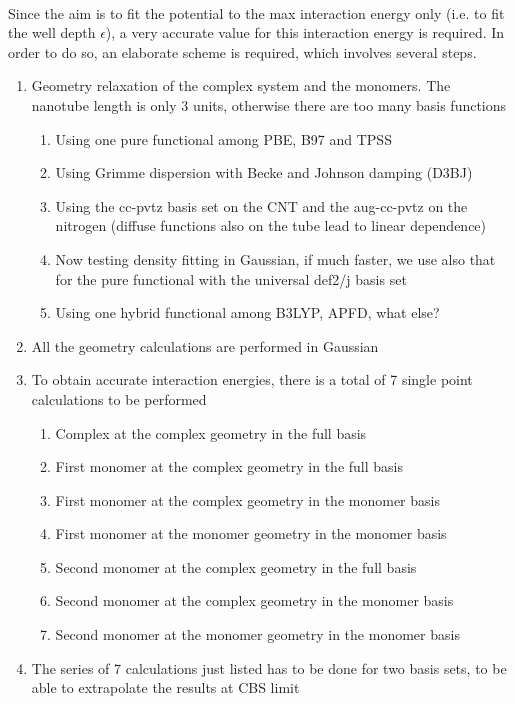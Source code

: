\documentclass[utf8]{article}
\begin{document}
\\
Since the aim is to fit the potential to the max interaction energy only (i.e. to fit the well depth $\epsilon$), a very accurate value for this interaction energy is required. In order to do so, an elaborate scheme is required, which involves several steps.\\
%
\begin{enumerate}
    \item Geometry relaxation of the complex system and the monomers. The nanotube length is only 3 units, otherwise there are too many basis functions
    \begin{enumerate}
        \item Using one pure functional among PBE, B97 and TPSS
        \item Using Grimme dispersion with Becke and Johnson damping (D3BJ)
        \item Using the cc-pvtz basis set on the CNT and the aug-cc-pvtz on the nitrogen (diffuse functions also on the tube lead to linear dependence)
        \item Now testing density fitting in Gaussian, if much faster, we use also that for the pure functional with the universal def2/j basis set
        \item Using one hybrid functional among B3LYP, APFD, what else?
    \end{enumerate}
    \item All the geometry calculations are performed in Gaussian
    \item To obtain accurate interaction energies, there is a total of 7 single point calculations to be performed
    \begin{enumerate}
        \item Complex at the complex geometry in the full basis
        \item First monomer at the complex geometry in the full basis
        \item First monomer at the complex geometry in the monomer basis
        \item First monomer at the monomer geometry in the monomer basis
        \item Second monomer at the complex geometry in the full basis
        \item Second monomer at the complex geometry in the monomer basis
        \item Second monomer at the monomer geometry in the monomer basis
    \end{enumerate}
    \item The series of 7 calculations just listed has to be done for two basis sets, to be able to extrapolate the results at CBS limit

\end{enumerate}
\end{document}
